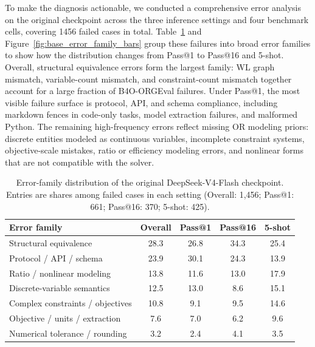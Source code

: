 To make the diagnosis actionable, we conducted a comprehensive error analysis on the
original checkpoint across the three inference settings and four benchmark
cells, covering 1456 failed cases in total. Table~\ref{tab:original_checkpoint_error_families}
and Figure~\ref{fig:base_error_family_bars} group these failures into broad
error families to show how the distribution changes from Pass@1 to Pass@16 and
5-shot. Overall, structural equivalence errors form the largest family: WL graph
mismatch, variable-count mismatch, and constraint-count mismatch together
account for a large fraction of B4O-ORGEval failures. Under Pass@1, the most
visible failure surface is protocol, API, and schema compliance, including
markdown fences in code-only tasks, model extraction failures, and malformed
Python. The remaining high-frequency errors reflect missing OR modeling priors:
discrete entities modeled as continuous variables, incomplete constraint
systems, objective-scale mistakes, ratio or efficiency modeling errors, and
nonlinear forms that are not compatible with the solver.


\begin{table}[t]
\centering
\small
\caption{Error-family distribution of the original DeepSeek-V4-Flash
checkpoint. Entries are shares among failed cases in each setting
(Overall: 1,456; Pass@1: 661; Pass@16: 370; 5-shot: 425).}
\label{tab:original_checkpoint_error_families}
\begin{tabular}{lcccc}
\toprule
Error family & Overall & Pass@1 & Pass@16 & 5-shot \\
\midrule
Structural equivalence & 28.3 & 26.8 & 34.3 & 25.4 \\
Protocol / API / schema & 23.9 & 30.1 & 24.3 & 13.9 \\
Ratio / nonlinear modeling & 13.8 & 11.6 & 13.0 & 17.9 \\
Discrete-variable semantics & 12.5 & 13.0 & 8.6 & 15.1 \\
Complex constraints / objectives & 10.8 & 9.1 & 9.5 & 14.6 \\
Objective / units / extraction & 7.6 & 7.0 & 6.2 & 9.6 \\
Numerical tolerance / rounding & 3.2 & 2.4 & 4.1 & 3.5 \\
\bottomrule
\end{tabular}
\end{table}

